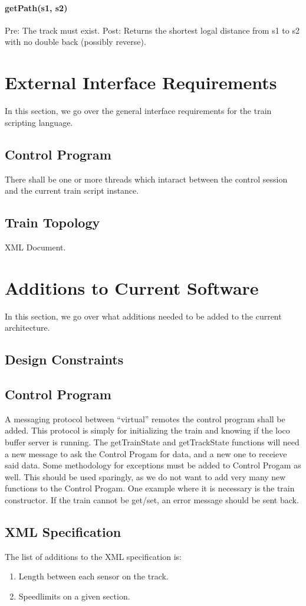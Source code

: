 \documentclass[a4paper,11pt,notitlepage]{article}
\def\CS{Control Progam\xspace} \def\LC{Local Copy of Train State\xspace} \def\TN{Track Node\xspace}
\begin{document}
\paragraph{getPath(s1, s2)} Pre: The track must exist.  Post: Returns the shortest logal distance from s1 to s2 with no double back (possibly reverse).

\newpage
\section{External Interface Requirements}
    In this section, we go over the general interface requirements for the train scripting language.
\subsection{Control Program}
    There shall be one or more threads which intaract between the control session and the current train script instance.
\subsection{Train Topology}
	XML Document.

\newpage
\section{Additions to Current Software}
    In this section, we go over what additions needed to be added to the current architecture.
\subsection{Design Constraints}
\subsection{Control Program}
    A messaging protocol between ``virtual'' remotes the control program shall be added.  This protocol is simply for initializing the train and knowing if the loco buffer server is running. The getTrainState and getTrackState functions will need a new message to ask the \CS for data, and a new one to receieve said data.
	Some methodology for exceptions must be added to \CS as well. This should be used sparingly, as we do not want to add very many new functions to the \CS. One example where it is necessary is the train constructor. If the train cannot be get/set, an error message should be sent back.
\subsection{XML Specification}
    The list of additions to the XML specification is:
\begin{enumerate}
    \item Length between each sensor on the track.
    \item Speedlimits on a given section.
\end{enumerate}
\end{document}
